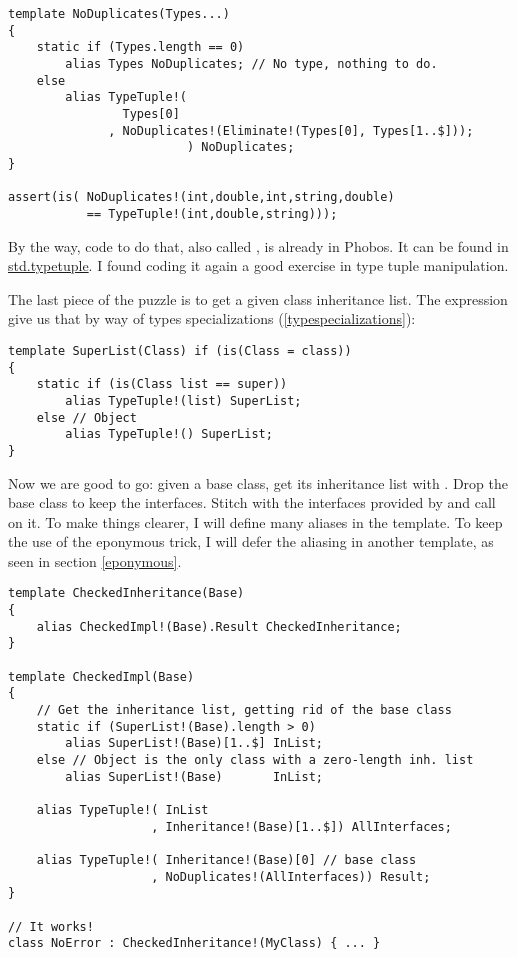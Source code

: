 \begin{verbatim}
template NoDuplicates(Types...)
{
    static if (Types.length == 0)
        alias Types NoDuplicates; // No type, nothing to do.
    else
        alias TypeTuple!( 
                Types[0]
              , NoDuplicates!(Eliminate!(Types[0], Types[1..$]));
                         ) NoDuplicates;
}

assert(is( NoDuplicates!(int,double,int,string,double)
           == TypeTuple!(int,double,string)));
\end{verbatim}

By the way, code to do that, also called , is already in Phobos. It can be found in \href{www.d-programming-language.org/phobos/std_typetuple.html}{std.typetuple}. I found coding it again a good exercise in type tuple manipulation.

The last piece of the puzzle is to get a given class inheritance list. The  expression give us that by way of types specializations (\ref{typespecializations}):

\begin{verbatim}
template SuperList(Class) if (is(Class = class))
{
    static if (is(Class list == super))
        alias TypeTuple!(list) SuperList;
    else // Object
        alias TypeTuple!() SuperList;
}
\end{verbatim}

Now we are good to go: given a base class, get its inheritance list with . Drop the base class to keep the interfaces. Stitch with the interfaces provided by  and call  on it. To make things clearer, I will define many aliases in the template. To keep the use of the eponymous trick, I will defer the aliasing in another template, as seen in section \ref{eponymous}.

\begin{verbatim}
template CheckedInheritance(Base)
{
    alias CheckedImpl!(Base).Result CheckedInheritance;
}

template CheckedImpl(Base)
{
    // Get the inheritance list, getting rid of the base class
    static if (SuperList!(Base).length > 0)
        alias SuperList!(Base)[1..$] InList;
    else // Object is the only class with a zero-length inh. list
        alias SuperList!(Base)       InList;

    alias TypeTuple!( InList
                    , Inheritance!(Base)[1..$]) AllInterfaces;

    alias TypeTuple!( Inheritance!(Base)[0] // base class
                    , NoDuplicates!(AllInterfaces)) Result;
} 

// It works!
class NoError : CheckedInheritance!(MyClass) { ... }
\end{verbatim}


